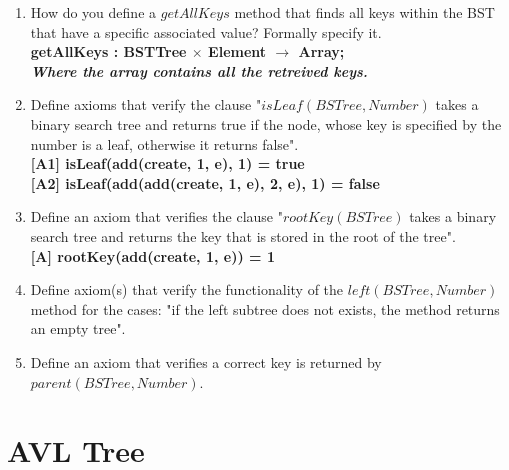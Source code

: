 \documentclass[12pt]{article}
\begin{document}
\begin{spacing}{1.5}
\begin{enumerate}
\item How do you define a $getAllKeys$ method that finds all keys within the BST that have a specific associated value? Formally specify it.\\
\textbf{getAllKeys : BSTTree $\times$ Element $\rightarrow$ Array; \\ \textit{Where the array contains all the retreived keys.}}

\item Define axioms that verify the clause "$isLeaf(BSTree, Number)$ takes a binary search tree and returns true if the node, whose key is specified by the number is a leaf, otherwise it returns false".\\
\hspace*{5mm} \textbf{[A1] isLeaf(add(create, 1, e), 1) = true}\\
\hspace*{5mm} \textbf{[A2] isLeaf(add(add(create, 1, e), 2, e), 1) = false}

\item Define an axiom that verifies the clause "$rootKey(BSTree)$ takes a binary search tree and returns the key that is stored in the root of the tree".\\
\hspace*{5mm} \textbf{[A] rootKey(add(create, 1, e)) = 1}\\

\item Define axiom(s) that verify the functionality of the $left(BSTree, Number)$ method for the cases: "if the left subtree does not exists, the method returns an empty tree".\\

\item Define an axiom that verifies a correct key is returned by $parent(BSTree, Number)$.\\

\end{enumerate}

\newpage

\section*{AVL Tree}


\end{spacing}
\end{document}
